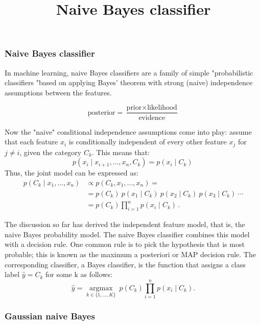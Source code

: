 \documentclass[11pt]{article}
\title{Naive Bayes classifier}
\begin{document}
    
    
    \maketitle
    
    

    
    \subsubsection{Naive Bayes classifier}\label{naive-bayes-classifier}

In machine learning, naive Bayes classifiers are a family of simple
"probabilistic classifiers "based on applying Bayes' theorem with strong
(naive) independence assumptions between the features.

\[{\mbox{posterior}}={\frac {{\mbox{prior}}\times {\mbox{likelihood}}}{\mbox{evidence}}}\]

Now the "naive" conditional independence assumptions come into play:
assume that each feature \(x_{i}\) is conditionally independent of every
other feature \(x_{j}\) for \(j\neq i\), given the category \(C_{k}\).
This means that:
\[{\displaystyle p(x_{i}\mid x_{i+1},\dots ,x_{n},C_{k})=p(x_{i}\mid C_{k})\,}\]
Thus, the joint model can be expressed as:
\[{\displaystyle {\begin{aligned}p(C_{k}\mid x_{1},\dots ,x_{n})&\varpropto p(C_{k},x_{1},\dots ,x_{n})=\\&=p(C_{k})\ p(x_{1}\mid C_{k})\ p(x_{2}\mid C_{k})\ p(x_{3}\mid C_{k})\ \cdots \\&=p(C_{k})\prod _{i=1}^{n}p(x_{i}\mid C_{k})\,.\end{aligned}}}\]

    The discussion so far has derived the independent feature model, that
is, the naive Bayes probability model. The naive Bayes classifier
combines this model with a decision rule. One common rule is to pick the
hypothesis that is most probable; this is known as the maximum a
posteriori or MAP decision rule. The corresponding classifier, a Bayes
classifier, is the function that assigns a class label
\({\hat {y}}=C_{k}\) for some k as follows:
\[{\displaystyle {\hat {y}}={\underset {k\in \{1,\dots ,K\}}{\operatorname {argmax} }}\ p(C_{k})\displaystyle \prod _{i=1}^{n}p(x_{i}\mid C_{k}).}\]

    \subsubsection{Gaussian naive Bayes}\label{gaussian-naive-bayes}
\end{document}
